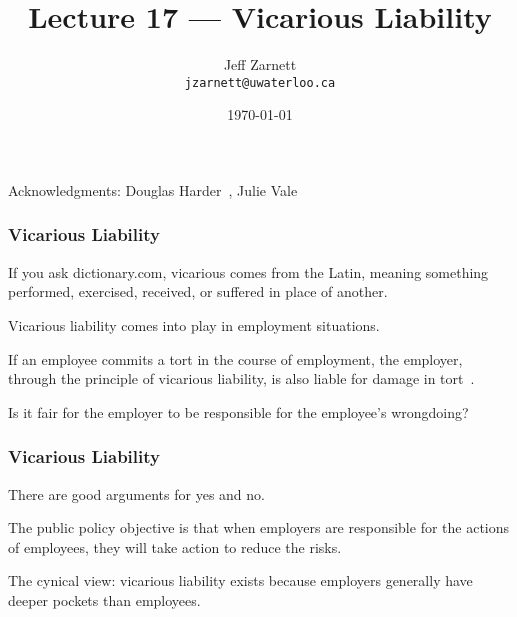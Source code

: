 

\title{Lecture 17 --- Vicarious Liability }

\author{Jeff Zarnett \\ \small \texttt{jzarnett@uwaterloo.ca}}
\date{\today}




\begin{frame}
  \titlepage

\begin{center}
  \small{Acknowledgments: Douglas Harder~\cite{dwh}, Julie Vale~\cite{jv}}
  \end{center}
\end{frame}



\begin{frame}
\frametitle{Vicarious Liability}

If you ask dictionary.com, vicarious comes from the Latin, meaning something performed, exercised, received, or suffered in place of another.

Vicarious liability comes into play in employment situations.

If an employee commits a tort in the course of employment, the employer, through the principle of vicarious liability, is also liable for damage in tort~\cite{lpe}.

Is it fair for the employer to be responsible for the employee's wrongdoing?

\end{frame}



\begin{frame}
\frametitle{Vicarious Liability}

There are good arguments for yes and no.

The public policy objective is that when employers are responsible for the actions of employees, they will take action to reduce the risks.


The cynical view: vicarious liability exists because employers generally have deeper pockets than employees.

\end{frame}



